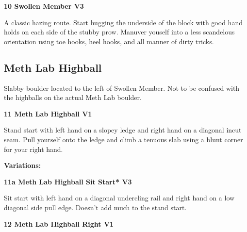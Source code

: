 \begin{multicols}{2}
\needspace{1.5cm}
\label{rt:Swollen Member}
\colorbox{green!20}{
\parbox{0.95\linewidth}{
\textbf{
10 Swollen Member V3  
}}}

\begin{adjustwidth}{0.5cm}{}			
A classic hazing route. Start hugging the underside of the block with good hand holds on each side of the stubby prow. Manuver youself into a less scandelous orientation using toe hooks, heel hooks, and  all manner of dirty tricks.
\end{adjustwidth}




\needspace{1.5cm}
\subsection*{Meth Lab Highball}\label{bf:Meth Lab Highball}
Slabby boulder located to the left of Swollen Member. Not to be confused with the highballs on the actual Meth Lab boulder.\\
	


\needspace{1.5cm}
\label{rt:Meth Lab Highball}
\colorbox{green!20}{
\parbox{0.95\linewidth}{
\textbf{
11 Meth Lab Highball V1  \warn
}}}

\begin{adjustwidth}{0.5cm}{}			
Stand start with left hand on a slopey ledge and right hand on a diagonal incut seam. Pull yourself onto the ledge and climb a tenuous slab using a blunt corner for your right hand.
\end{adjustwidth}

\begin{adjustwidth}{0.5cm}{}				
\needspace{3cm}
\textbf{Variations:} \newline

\needspace{1.5cm}
\label{vr:Meth Lab Highball Sit Start}
\colorbox{green!20}{
\parbox{0.95\linewidth}{
\textbf{
11a Meth Lab Highball Sit Start* V3  
}}}

\begin{adjustwidth}{0.5cm}{}			
Sit start with left hand on a diagonal undercling rail and right hand on a low diagonal side pull edge. Doesn't add much to the stand start.
\end{adjustwidth}


\end{adjustwidth}


\needspace{1.5cm}
\label{rt:Meth Lab Highball Right}
\colorbox{green!20}{
\parbox{0.95\linewidth}{
\textbf{
12 Meth Lab Highball Right V1  
}}}


\end{multicols}
